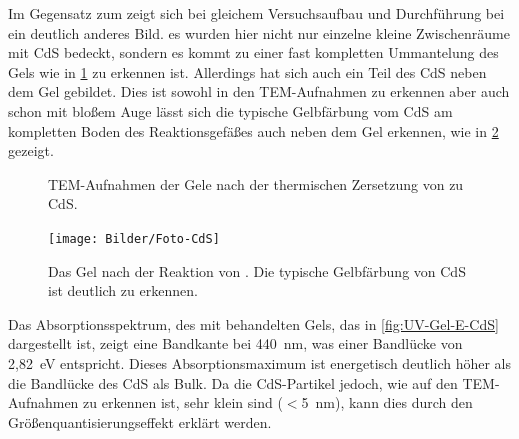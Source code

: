 		Im Gegensatz zum  zeigt sich bei gleichem Versuchsaufbau und Durchführung bei  ein deutlich anderes Bild.
		es wurden hier nicht nur einzelne  kleine Zwischenräume mit CdS bedeckt, sondern es kommt zu einer fast kompletten Ummantelung des Gels wie in \cref{fig:Gel-E-CdS} zu erkennen ist.
		Allerdings hat sich auch ein Teil des CdS neben dem Gel gebildet. 
		Dies ist sowohl in den TEM-Aufnahmen zu erkennen aber auch schon mit bloßem Auge lässt sich die typische Gelbfärbung vom CdS am kompletten Boden des Reaktionsgefäßes auch neben dem Gel erkennen, wie in \cref{fig:Foto-CdS} gezeigt.
		\begin{figure}[H]
			\centering
			\caption{TEM-Aufnahmen der Gele nach der thermischen Zersetzung von  zu CdS.}
			\label{fig:Gel-E-CdS}
		\end{figure}
	
		\begin{figure}[H]
			\centering
			\texttt{[image: Bilder/Foto-CdS]} 	
			\caption{Das Gel nach der Reaktion von . Die typische Gelbfärbung von CdS ist deutlich zu erkennen.}
			\label{fig:Foto-CdS}
		\end{figure}
		
		Das Absorptionsspektrum, des mit  behandelten Gels, das in \cref{fig:UV-Gel-E-CdS} dargestellt ist, zeigt eine Bandkante bei \SI{440}{\nano\meter}, was einer Bandlücke von 2,82~eV entspricht. 
		Dieses Absorptionsmaximum ist energetisch deutlich höher als die Bandlücke des CdS als Bulk. 
		Da die CdS-Partikel jedoch, wie auf den TEM-Aufnahmen zu erkennen ist, sehr klein sind ($<$\SI{5}{\nano\meter}), kann dies durch den Größenquantisierungseffekt erklärt werden.
		
